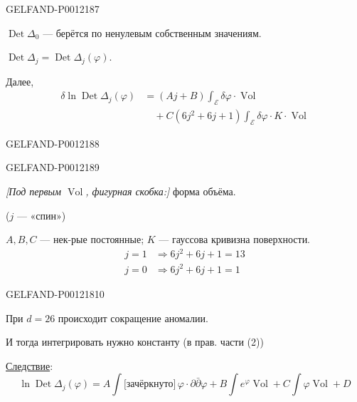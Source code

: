 \begin{GelfandAdjacentEvidence}{GELFAND-P001218}{7}


\(\operatorname{Det}\Delta_0\) --- берётся по ненулевым собственным значениям.

\(\operatorname{Det}\Delta_j=\operatorname{Det}\Delta_j(\varphi)\).

Далее,
\begin{equation*}
\begin{aligned}
\delta\ln\operatorname{Det}\Delta_j(\varphi)
&=(Aj+B)\int_{\mathcal E}\delta\varphi\cdot\operatorname{Vol}\\
&\quad+C(6j^2+6j+1)\int_{\mathcal E}\delta\varphi\cdot K\cdot\operatorname{Vol}
\end{aligned}\tag{3}
\end{equation*}
\end{GelfandAdjacentEvidence}
\begin{GelfandAdjacentEvidence}{GELFAND-P001218}{8}

\end{GelfandAdjacentEvidence}
\begin{GelfandAdjacentEvidence}{GELFAND-P001218}{9}


\textit{[Под первым \(\operatorname{Vol}\), фигурная скобка:]} форма объёма.

(\(j\) --- «спин»)

\(A,B,C\) --- нек-рые постоянные; \(K\) --- гауссова кривизна поверхности.
\[
\begin{aligned}
j=1&\Rightarrow 6j^2+6j+1=13\\
j=0&\Rightarrow 6j^2+6j+1=1
\end{aligned}
\]
\end{GelfandAdjacentEvidence}
\begin{GelfandAdjacentEvidence}{GELFAND-P001218}{10}


При \(d=26\) происходит сокращение аномалии.

И тогда интегрировать нужно константу (в прав. части (2))

\underline{Следствие}:
\begin{equation*}
\ln\operatorname{Det}\Delta_j(\varphi)
=A\int\text{[зачёркнуто]}\,\varphi\cdot\partial\bar\partial\varphi
+B\int e^\varphi\operatorname{Vol}
+C\int\varphi\operatorname{Vol}+D\tag{4}
\end{equation*}
\end{GelfandAdjacentEvidence}


